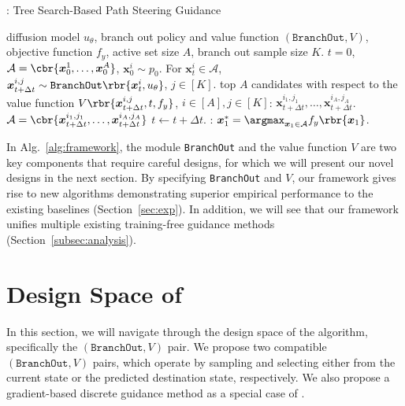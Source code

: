 \begin{algorithm}
\begin{algorithmic}[1]
\caption{\ouralg: {Tree} Search-Based Path Steering {G}uidance}
\label{alg:framework}
 diffusion model $u_{\theta}$, branch out policy and value function $ (\texttt{BranchOut}, V)$, objective function $f_y$, active set size $A$, branch out sample size $K$.
 $t=0$,  $\mathcal{A} = \cbr{  \boldsymbol{x}_0^{1}, \ldots, \boldsymbol{x}_0^{A} }$,  $\boldsymbol{x}_0^{i} \sim p_0$.
 For $\boldsymbol{x}_{t}^{i} \in \mathcal{A}$, \\
$\boldsymbol{x}_{t+\Delta t}^{i, j} \sim  \texttt{BranchOut}\rbr{\boldsymbol{x}_t^{i}, u_\theta}$, $ j \in [K]$. 
 top $A$ candidates with respect to the value function $V\rbr{\boldsymbol{x}_{t+\Delta t}^{i, j}, t, f_y}$, $i \in [A], j \in [K] $: $\boldsymbol{x}_{t+\Delta t}^{i_1, j_1},\ldots,\boldsymbol{x}_{t+\Delta t}^{i_A, j_A}$.
  $ \mathcal{A} = \cbr{  \boldsymbol{x}_{t+\Delta t}^{i_1,j_1}, \ldots, \boldsymbol{x}_{t+\Delta t}^{i_A, j_A} }$
\STATE $t \leftarrow t + \Delta t $.
\ENDWHILE
{}: $\boldsymbol{x}_1^\ast = \argmax_{\boldsymbol{x}_1 \in \mathcal{A}}f_y\rbr{\boldsymbol{x}_1}$.

\end{algorithmic}

\end{algorithm}

In Alg.~\ref{alg:framework}, the module \texttt{BranchOut} and the value function $V$ are two key components that require careful designs, for which we will present our novel designs in the next section. By specifying \texttt{BranchOut} and $V$, our framework gives rise to new algorithms demonstrating superior empirical performance to the existing baselines (Section~\ref{sec:exp}). In addition, we will see that our framework unifies multiple existing training-free guidance methods (Section~\ref{subsec:analysis}). 


\section{Design Space of \ouralg}\label{sec: design space}
In this section, we will navigate through the design space of the \ouralg algorithm, specifically the $(\texttt{BranchOut}, V)$ pair. We propose two compatible $(\texttt{BranchOut}, V)$ pairs, which operate by sampling and selecting either from the current state or the predicted destination state, respectively. We also propose a gradient-based discrete guidance method as a special case of \ouralg. 





